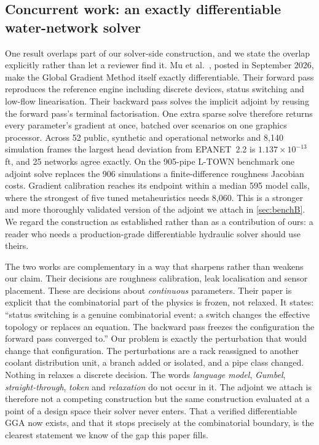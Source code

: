 \subsection{Concurrent work: an exactly differentiable water-network solver}
\label{sec:rw-concurrent}
One result overlaps part of our solver-side construction, and we state the
overlap explicitly rather than let a reviewer find it.  Mu et al.\
\cite{mu2026gga}, posted in September 2026, make
the Global Gradient Method itself exactly differentiable.  Their forward pass
reproduces the reference engine including discrete devices, status switching and
low-flow linearisation.  Their backward pass solves the implicit adjoint by
reusing the forward pass's terminal factorisation.  One extra sparse solve
therefore returns every parameter's gradient at once, batched over scenarios on
one graphics processor.  Across 52 public, synthetic and operational networks and
8{,}140 simulation frames the largest head deviation from EPANET~2.2 is
$1.137\times10^{-13}$\,ft, and 25 networks agree exactly.  On the 905-pipe L-TOWN
benchmark one adjoint solve replaces the 906 simulations a finite-difference
roughness Jacobian costs.  Gradient calibration reaches its endpoint within a
median 595 model calls, where the strongest of five tuned metaheuristics needs
8{,}060.  This is a stronger and more thoroughly validated version of the
adjoint we attach in \cref{sec:benchB}.  We regard the construction as
established rather than as a contribution of ours: a reader who needs a
production-grade differentiable hydraulic solver should use theirs.

The two works are complementary in a way that sharpens rather than weakens our
claim.  Their decisions are roughness calibration, leak localisation and sensor
placement.  These are decisions about \emph{continuous} parameters.  Their paper
is explicit that the combinatorial part of the physics is frozen, not relaxed.
It states: ``status switching is a genuine combinatorial event: a switch changes
the effective topology or replaces an equation.  The backward pass freezes the
configuration the forward pass converged to.''  Our problem is exactly the
perturbation that would change that configuration.  The perturbations are a rack
reassigned to another coolant distribution unit, a branch added or isolated, and a
pipe class changed.
Nothing in \cite{mu2026gga} relaxes a discrete decision.  The words
\emph{language model}, \emph{Gumbel}, \emph{straight-through}, \emph{token} and
\emph{relaxation} do not occur in it.  The adjoint we attach is therefore
not a competing construction but the same construction evaluated at a point of a
design space their solver never enters.  That a verified differentiable GGA now
exists, and that it stops precisely at the combinatorial boundary, is the
clearest statement we know of the gap this paper fills.

